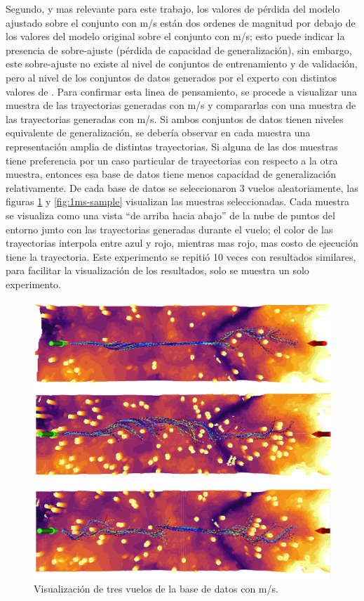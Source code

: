 Segundo, y mas relevante para este trabajo, los valores de pérdida del modelo ajustado sobre el conjunto con  m/s están dos ordenes de magnitud por debajo de los valores del modelo original sobre el conjunto con  m/s; esto puede indicar la presencia de sobre-ajuste (pérdida de capacidad de generalización), sin embargo, este sobre-ajuste no existe al nivel de conjuntos de entrenamiento y de validación, pero al nivel de los conjuntos de datos generados por el experto con distintos valores de . Para confirmar esta linea de pensamiento, se procede a visualizar una muestra de las trayectorias generadas con  m/s y compararlas con una muestra de las trayectorias generadas con  m/s. Si ambos conjuntos de datos tienen niveles equivalente de generalización, se debería observar en cada muestra una representación amplia de distintas trayectorias. Si alguna de las dos muestras tiene preferencia por un caso particular de trayectorias con respecto a la otra muestra, entonces esa base de datos tiene menos capacidad de generalización relativamente. De cada base de datos se seleccionaron 3 vuelos aleatoriamente, las figuras \ref{fig:7ms-sample} y \ref{fig:1ms-sample} visualizan las muestras seleccionadas. Cada muestra se visualiza como una vista ``de arriba hacia abajo'' de la nube de puntos del entorno junto con las trayectorias generadas durante el vuelo; el color de las trayectorias interpola entre azul y rojo, mientras mas rojo, mas costo de ejecución tiene la trayectoria. Este experimento se repitió 10 veces con resultados similares, para facilitar la visualización de los resultados, solo se muestra un solo experimento.

\begin{figure}[H]
    \centering
    \includegraphics[scale=0.4]{partes/ImgJoao/7ms-sample.png}
    \caption[Visualización de tres vuelos de la base de datos con  m/s.]{Visualización de tres vuelos de la base de datos con  m/s.}
    \label{fig:7ms-sample}
\end{figure}

